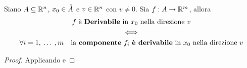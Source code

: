 \begin{proposition}
	Siano $A \subseteq \mathbb{R}^n$, $x_0 \in \accentset{\circ}{A}$ e $v \in \mathbb{R}^n$ con $v \neq 0$. Sia $f: A \to \mathbb{R}^m$, allora
	\begin{equation*}
		\begin{gathered}
			f \text{ è \textbf{Derivabile} in $x_0$ nella direzione $v$}\\
			\iff\\
			\forall i = 1,\:\dotsc\:,m \quad \text{la \textbf{componente} $f_i$ \textbf{è derivabile} in $x_0$ nella direzione $v$}
		\end{gathered}
	\end{equation*}
	\begin{proof}
		Applicando  e  %
	\end{proof}
\end{proposition}
